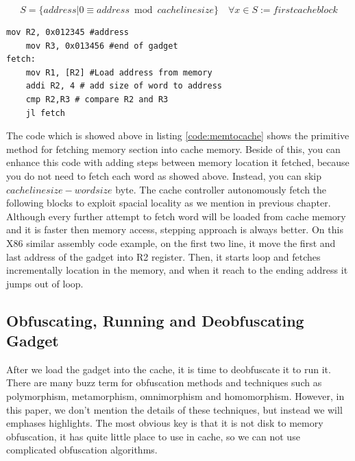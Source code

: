  	    	\begin{equation}
 	    		S = \{address | 0\equiv address \bmod{cache line size}\} \quad
 	    		\forall x \in S := first cache block
 	    	\end{equation} 

			\begin{lstlisting}[caption=The code example for loading a section of memory to cache, label=code:memtocache]
	mov R2, 0x012345 #address
	mov R3, 0x013456 #end of gadget
fetch: 	
	mov R1, [R2] #Load address from memory
	addi R2, 4 # add size of word to address
	cmp R2,R3 # compare R2 and R3
	jl fetch
			\end{lstlisting}

			The code which is showed above in listing \ref{code:memtocache} shows the primitive method for fetching memory section into cache memory. Beside of this, you can enhance this code with adding steps between memory location it fetched, because you do not need to fetch each word as showed above. Instead, you can skip $cachelinesize - wordsize$ byte. The cache controller autonomously fetch the following blocks to exploit spacial locality as we mention in previous chapter. Although every further attempt to fetch word will be loaded from cache memory and it is faster then memory access, stepping approach is always better. On this X86 similar assembly code example, on the first two line, it move the first and last address of the gadget into R2 register. Then, it starts loop and fetches incrementally location in the memory, and when it reach to the ending address it jumps out of loop. 
	    \subsection{Obfuscating, Running and Deobfuscating Gadget}
			After we load the gadget into the cache, it is time to deobfuscate it to run it. There are many buzz term for obfuscation methods and techniques such as polymorphism, metamorphism, omnimorphism and homomorphism\cite{nachenberg1996understanding}\cite{li2011mechanisms}\cite{marpaung2012survey}\cite{balakrishnan2005code}. However, in this paper, we don't mention the details of these techniques, but instead we will emphases highlights. The most obvious key is that it is not disk to memory obfuscation, it has quite little place to use in cache, so we can not use complicated obfuscation algorithms. 

